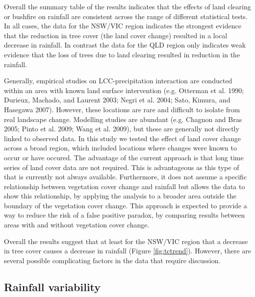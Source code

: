 \documentclass[fleqn,10pt,lineno]{wlpeerj} %
\begin{document}
Overall the summary table of the results indicates that the effects of
land clearing or bushfire on rainfall are consistent across the range of
different statistical tests. In all cases, the data for the NSW/VIC
region indicates the strongest evidence that the reduction in tree cover
(the land cover change) resulted in a local decrease in rainfall. In
contrast the data for the QLD region only indicates weak evidence that
the loss of trees due to land clearing resulted in reduction in the
rainfall.

Generally, empirical studies on LCC-precipitation interaction are
conducted within an area with known land surface intervention (e.g.
Otterman et al. 1990; Durieux, Machado, and Laurent 2003; Negri et al.
2004; Sato, Kimura, and Hasegawa 2007). However, these locations are
rare and difficult to isolate from real landscape change. Modelling
studies are abundant (e.g. Chagnon and Bras 2005; Pinto et al. 2009;
Wang et al. 2009), but these are generally not directly linked to
observed data. In this study we tested the effect of land cover change
across a broad region, which included locations where changes were known
to occur or have occured. The advantage of the current approach is that
long time series of land cover data are not required. This is
advantageous as this type of that is currently not always available.
Furthermore, it does not assume a specific relationship between
vegetation cover change and rainfall but allows the data to show this
relationship, by applying the analysis to a broader area outside the
boundary of the vegetation cover change. This approach is expected to
provide a way to reduce the risk of a false positive paradox, by
comparing results between areas with and without vegetation cover
change.

Overall the results suggest that at least for the NSW/VIC region that a
decrease in tree cover causes a decrease in rainfall (Figure
\ref{fig:tctrend}). However, there are several possible complicating
factors in the data that require discussion.

\subsection{Rainfall variability}\label{rainfall-variability}
\end{document}
